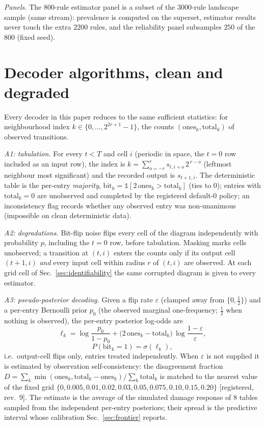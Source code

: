 \documentclass[aip,cha,amsmath,amssymb,reprint,floatfix]{revtex4-2}
\begin{document}
\emph{Panels.} The $800$-rule estimator panel is a subset of the $3000$-rule
landscape sample (same stream): prevalence is computed on the superset,
estimator results never touch the extra $2200$ rules, and the reliability
panel subsamples $250$ of the $800$ (fixed seed).

\section{Decoder algorithms, clean and degraded}
\label{app:algorithms}

Every decoder in this paper reduces to the same sufficient statistics: for
neighbourhood index $k\in\{0,\dots,2^{2r+1}-1\}$, the counts
$(\mathrm{ones}_k,\mathrm{total}_k)$ of observed transitions.

\emph{A1: tabulation.} For every $t<T$ and cell $i$ (periodic in space, the
$t{=}0$ row included as an input row), the index is
$k=\sum_{o=-r}^{r} s_{t,i+o}\,2^{\,r-o}$ (leftmost neighbour most
significant) and the recorded output is $s_{t+1,i}$. The deterministic table
is the per-entry \emph{majority}, $\mathrm{bit}_k =
\mathbb{1}[2\,\mathrm{ones}_k > \mathrm{total}_k]$ (ties to $0$); entries
with $\mathrm{total}_k=0$ are unobserved and completed by the registered
default-$0$ policy; an inconsistency flag records whether any observed entry
was non-unanimous (impossible on clean deterministic data).

\emph{A2: degradations.} Bit-flip noise flips every cell of the diagram
independently with probability $p$, including the $t{=}0$ row, before
tabulation. Masking marks cells unobserved; a transition at $(t,i)$ enters
the counts only if its output cell $(t{+}1,i)$ \emph{and} every input cell
within radius $r$ of $(t,i)$ are observed. At each grid cell of
Sec.~\ref{sec:identifiability} the same corrupted diagram is given to every
estimator.

\emph{A3: pseudo-posterior decoding.} Given a flip rate $\varepsilon$
(clamped away from $\{0,\tfrac12\}$) and a per-entry Bernoulli prior $p_0$
(the observed marginal one-frequency; $\tfrac12$ when nothing is observed),
the per-entry posterior log-odds are
\[
\ell_k=\log\frac{p_0}{1-p_0}
+\bigl(2\,\mathrm{ones}_k-\mathrm{total}_k\bigr)\,
\log\frac{1-\varepsilon}{\varepsilon},
\]
\[
P(\mathrm{bit}_k{=}1)=\sigma(\ell_k),
\]
i.e.\ output-cell flips only, entries treated independently. When
$\varepsilon$ is not supplied it is estimated by observation
self-consistency: the disagreement fraction
$D=\sum_k\min(\mathrm{ones}_k,\mathrm{total}_k-\mathrm{ones}_k)/\sum_k
\mathrm{total}_k$ is matched to the nearest value of the fixed grid
$\{0,0.005,0.01,0.02,0.03,0.05,0.075,0.10,0.15,0.20\}$ [registered, rev.~9].
The estimate is the average of the simulated damage response of $8$ tables
sampled from the independent per-entry posteriors; their spread is the
predictive interval whose calibration Sec.~\ref{sec:frontier} reports.
\end{document}
